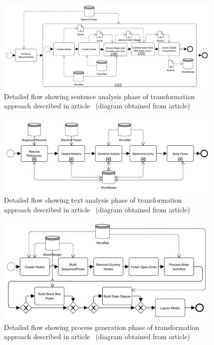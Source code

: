 \begin{figure}[H]
	\centering
	\includegraphics[width=\textwidth]{./images/friedrich_sentence_analysis.pdf}
	\caption{Detailed flow showing sentence analysis phase of transformation approach described in article~\cite{friedrich-2011} (diagram obtained from article)}
	\label{fig:friedrich_sentence_analysis}
\end{figure}
\begin{figure}[H]
	\centering
	\includegraphics[width=\textwidth]{./images/friedrich_text_analysis.pdf}
	\caption{Detailed flow showing text analysis phase of transformation approach described in article~\cite{friedrich-2011} (diagram obtained from article)}
	\label{fig:friedrich_text_analysis}
\end{figure}
\begin{figure}[H]
	\centering
	\includegraphics[width=\textwidth]{./images/friedrich_process_generation.pdf}
	\caption{Detailed flow showing process generation phase of transformation approach described in article~\cite{friedrich-2011} (diagram obtained from article)}
	\label{fig:friedrich_process_generation}
\end{figure}
